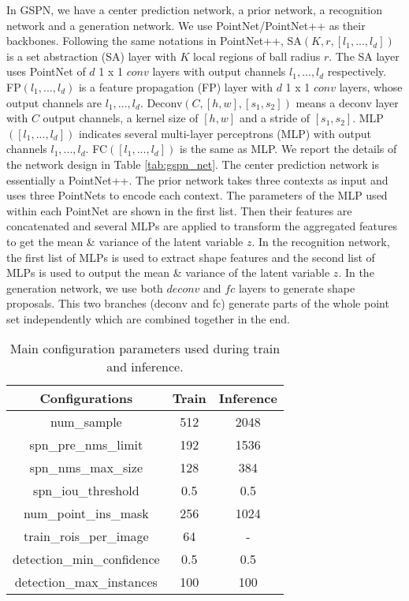 \documentclass[10pt,twocolumn,letterpaper]{article}
\begin{document}
In GSPN, we have a center prediction network, a prior network, a recognition network and a generation network. We use PointNet/PointNet++ as their backbones. Following the same notations in PointNet++, SA$(K, r, [l_1, ..., l_d])$ is a set abstraction (SA) layer with $K$ local regions of ball radius $r$. The SA layer uses PointNet of $d$ 1 x 1 $conv$ layers with output channels $l_1, ..., l_d$ respectively. FP$(l_1, ..., l_d)$ is a feature propagation (FP) layer with $d$ 1 x 1 $conv$ layers, whose output channels are $l_1, ..., l_d$. Deconv$(C, [h, w], [s_1, s_2])$ means a deconv layer with $C$ output channels, a kernel size of $[h, w]$ and a stride of $[s_1, s_2]$. MLP$([l_1, ..., l_d])$ indicates several multi-layer perceptrons (MLP) with output channels $l_1, ..., l_d$. FC$([l_1, ..., l_d])$ is the same as MLP. We report the details of the network design in Table \ref{tab:gspn_net}. The center prediction network is essentially a PointNet++. The prior network takes three contexts as input and uses three PointNets to encode each context. The parameters of the MLP used within each PointNet are shown in the first list. Then their features are concatenated and several MLPs are applied to transform the aggregated features to get the mean \& variance of the latent variable $z$. In the recognition network, the first list of MLPs is used to extract shape features and the second list of MLPs is used to output the mean \& variance of the latent variable $z$. In the generation network, we use both $deconv$ and $fc$ layers to generate shape proposals. This two branches (deconv and fc) generate parts of the whole point set independently which are combined together in the end.

\begin{table}[h]
    \centering
    \begin{tabular}{c|c|c}
    \toprule
        Configurations & Train & Inference \\
    \midrule
        num\_sample & 512 & 2048 \\
        spn\_pre\_nms\_limit & 192 & 1536 \\
        spn\_nms\_max\_size & 128 & 384 \\
        spn\_iou\_threshold & 0.5 & 0.5 \\
        num\_point\_ins\_mask & 256 & 1024 \\
        train\_rois\_per\_image & 64 & - \\
        detection\_min\_confidence & 0.5 & 0.5 \\
        detection\_max\_instances & 100 & 100 \\
    \bottomrule 
    \end{tabular}
    \caption{Main configuration parameters used during train and inference.}
    \label{tab:config}
\end{table}
\end{document}
